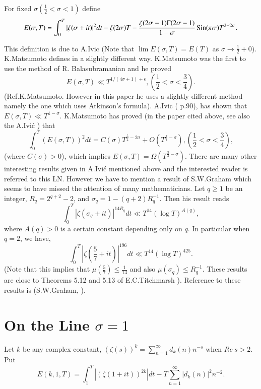 For fixed $\sigma \left(\frac{1}{2}<\sigma<1 \right)$ define  
{\fontsize{10}{12}\selectfont
$$
E(\sigma,T)=\int^{T}_{0}|\zeta(\sigma+it)|^{2}dt-\zeta(2\sigma)T-\frac{\zeta(2\sigma-1)\Gamma(2\sigma-1)}{1-\sigma}\operatorname{Sin}
(\pi\sigma)T^{2-2\sigma}. 
$$}

This definition is due to A.\@ Ivic (Note that $\lim E(\sigma,T)=E(T)$
as $\sigma\to \frac{1}{2}+0$). K.\@ Matsumoto defines in a slightly
different way. K.\@ Matsumoto was the first to use the method of R.\@
Balasubramanian and he proved
$$
E(\sigma,T)\ll
T^{1/(4\sigma+1)+\epsilon},\left(\frac{1}{2}<\sigma<\frac{3}{4}\right). 
$$
(Ref.\@ \cite{Matsumoto1}\pageoriginale K.\@ Matsumoto. However in this
paper he uses a slightly different method namely the one which uses Atkinson's
formula). A.\@ Ivic (\cite{Ivic2} p.\@ 90), has shown that
$E(\sigma,T)\ll T^{1-\sigma}$. K.\@ Matsumoto has proved (in the paper
cited above, see also the A.\@ Ivi\'c \cite{Ivic2}) that
$$
\int^{T}_{0}(E(\sigma,T))^{2}dt=C(\sigma)T^{\frac{5}{2}-2\sigma}+O(T^{\frac{7}{4}-\sigma}),\left(\frac{1}{2}<\sigma<\frac{3}{4}\right), 
$$ 
(where $C(\sigma)>0$), which implies
$E(\sigma,T)=\Omega(T^{\frac{3}{4}-\sigma})$. There are many other
interesting results given in A.\@ Ivi\'c \cite{Ivic2} mentioned above
and the interested reader is referred to this LN. However we have to
mention a result of S.W.\@ Graham which seems to have missed the
attention of many mathematicians. Let $q\geq 1$ be an integer,
$R_{q}=2^{q+2}-2$, and $\sigma_{q}=1-(q+2)R^{-1}_{q}$. Then his result
reads
$$
\int^{T}_{0}|\zeta(\sigma_{q}+it)|^{14R_{q}}dt\ll T^{14}(\log
T)^{A(q)},
$$
where $A(q)>0$ is a certain constant depending only on $q$. In
particular when $q=2$, we have,
$$
\int^{T}_{0}|\zeta\left(\frac{5}{7}+it\right)|^{196}dt\ll T^{14}(\log
T)^{425}. 
$$
(Note that this implies that $\mu(\frac{5}{7})\leq \frac{1}{14}$ and
also $\mu(\sigma_{q})\leq R^{-1}_{q}$. These results are close to
Theorems 5.12 and 5.13 of E.C.\@ Titchmarsh \cite{Titchmarsh1}). Reference to
these results is (S.W.\@ Graham, \cite{Graham1}).

\section{On the Line $\sigma=1$}\label{c6:sec6.5}

Let $k$ be any complex constant,
$(\zeta(s))^{k}=\sum\limits^{\infty}_{n=1}d_{k}(n)n^{-s}$ when $Re\ s>2$. Put
$$
E(k,1,T)=\int^{T}_{1}|(\zeta(1+it))^{2k}|dt-T\sum^{\infty}_{n=1}|d_{k}(n)|^{2}n^{-2}.
$$

